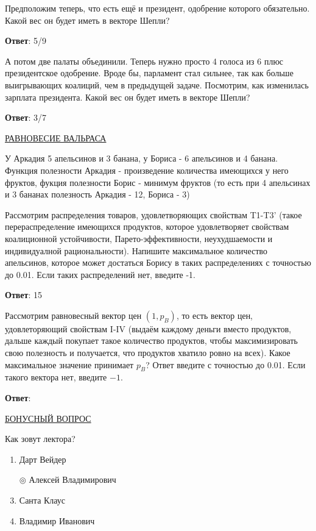 \task
Предположим теперь, что есть ещё и президент, одобрение которого обязательно. Какой вес он будет иметь в векторе Шепли?

\textbf{Ответ}: 
5/9

\task
А потом две палаты объединили. Теперь нужно просто 4 голоса из 6 плюс президентское одобрение. Вроде бы, парламент стал сильнее, так как больше выигрывающих коалиций, чем в предыдущей задаче. Посмотрим, как изменилась зарплата президента. Какой вес он будет иметь в векторе Шепли?

\textbf{Ответ}: 
3/7  %

\task
\underline{РАВНОВЕСИЕ ВАЛЬРАСА}

У Аркадия 5 апельсинов и 3 банана, у Бориса - 6 апельсинов и 4 банана. Функция полезности Аркадия - произведение количества имеющихся у него фруктов, фукция полезности Борис - минимум фруктов (то есть при 4 апельсинах и 3 бананах полезность Аркадия - 12, Бориса - 3)

Рассмотрим распределения товаров, удовлетворяющих свойствам T1-T3' (такое перераспределение имеющихся продуктов, которое удовлетворяет свойствам коалиционной устойчивости, Парето-эффективности, неухудшаемости и индивидуалной рациональности). Напишите максимальное количество апельсинов, которое может достаться Борису в таких распределениях с точностью до 0.01. Если таких распределений нет, введите -1.

\textbf{Ответ}: 
15

\task
Рассмотрим равновесный вектор цен $(1,p_B)$, то есть вектор цен, удовлеторяющий свойствам I-IV (выдаём каждому деньги вместо продуктов, дальше каждый покупает такое количество продуктов, чтобы максимизировать свою полезность и получается, что продуктов хватило ровно на всех). Какое максимальное значение принимает $p_B$? Ответ введите с точностью до 0.01. Если такого вектора нет, введите $-1$.

\textbf{Ответ}: 

\task
\underline{БОНУСНЫЙ ВОПРОС}

Как зовут лектора?

\begin{enumerate}[label=$\circ$]
	\item Дарт Вейдер
	\item[$\circledcirc$] Алексей Владимирович
	\item Санта Клаус
	\item Владимир Иванович
\end{enumerate}